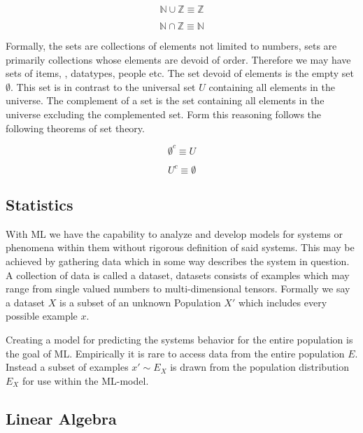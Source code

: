 \begin{equation}
\label{eqn:union}
\mathbb{N} \cup \mathbb{Z} \equiv \mathbb{Z}
\end{equation}

\begin{equation}
\label{eqn:intersection}
\mathbb{N} \cap \mathbb{Z} \equiv \mathbb{N}
\end{equation}

Formally, the sets are collections of elements not limited to numbers, sets are primarily collections whose elements are devoid of order. Therefore we may have sets of items, , datatypes, people etc. The set devoid of elements is the empty set $\emptyset$. This set is in contrast to the universal set $U$ containing all elements in the universe. The complement of a set is the set containing all elements in the universe excluding the complemented set. Form this reasoning follows the following theorems of set theory.

\begin{equation}
\label{eqn:emptyC}
\emptyset^c  \equiv U
\end{equation}

\begin{equation}
\label{eqnuniverseC}
U^c  \equiv \emptyset
\end{equation}



\subsection{Statistics}

With ML we have the capability to analyze and develop models for systems or phenomena within them without rigorous definition of said systems. This may be achieved by gathering data which in some way describes the system in question. A collection of data is called a dataset, datasets consists of examples which may range from single valued numbers to multi-dimensional tensors. Formally we say a dataset $X$ is a subset of an unknown Population $X'$ which includes every possible example $x$.


Creating a model for predicting the systems behavior for the entire population is the goal of ML. Empirically it is rare to access data from the entire population $E$. Instead a subset of examples $x' \sim E_{X}$ is drawn from the population distribution $E_{X}$ for use within the ML-model. 

\subsection{Linear Algebra}

